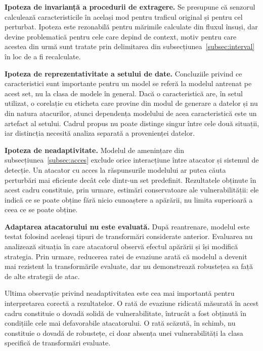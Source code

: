\textbf{Ipoteza de invarianță a procedurii de extragere.} Se presupune că senzorul calculează caracteristicile în același mod pentru traficul original și pentru cel perturbat. Ipoteza este rezonabilă pentru mărimile calculate din fluxul însuși, dar devine problematică pentru cele care depind de context, motiv pentru care acestea din urmă sunt tratate prin delimitarea din subsecțiunea~\ref{subsec:interval} în loc de a fi recalculate.

\textbf{Ipoteza de reprezentativitate a setului de date.} Concluziile privind ce caracteristici sunt importante pentru un model se referă la modelul antrenat pe acest set, nu la clasa de modele în general. Dacă o caracteristică are, în setul utilizat, o corelație cu eticheta care provine din modul de generare a datelor și nu din natura atacurilor, atunci dependența modelului de acea caracteristică este un artefact al setului. Cadrul propus nu poate distinge singur între cele două situații, iar distincția necesită analiza separată a provenienței datelor.

\textbf{Ipoteza de neadaptivitate.} Modelul de amenințare din subsecțiunea~\ref{subsec:acces} exclude orice interacțiune între atacator și sistemul de detecție. Un atacator cu acces la răspunsurile modelului ar putea căuta perturbări mai eficiente decât cele dintr-un set predefinit. Rezultatele obținute în acest cadru constituie, prin urmare, estimări conservatoare ale vulnerabilității: ele indică ce se poate obține fără nicio cunoaștere a apărării, nu limita superioară a ceea ce se poate obține.

\textbf{Adaptarea atacatorului nu este evaluată.}
După reantrenare, modelul este testat folosind aceleași tipuri de transformări considerate anterior. Evaluarea nu analizează situația în care atacatorul observă efectul apărării și își modifică strategia. Prin urmare, reducerea ratei de evaziune arată că modelul a devenit mai rezistent la transformările evaluate, dar nu demonstrează robustețea sa față de alte strategii de atac.

Ultima observație privind neadaptivitatea este cea mai importantă pentru interpretarea corectă a rezultatelor. O rată de evaziune ridicată măsurată în acest cadru constituie o dovadă solidă de vulnerabilitate, întrucât a fost obținută în condițiile cele mai defavorabile atacatorului. O rată scăzută, în schimb, nu constituie o dovadă de robustețe, ci doar absența unei vulnerabilități la clasa specifică de transformări evaluate.
